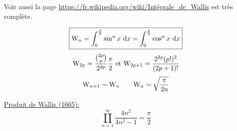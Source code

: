 Voir  aussi la page \url{https://fr.wikipedia.org/wiki/Intégrale_de_Wallis} est très complète. 

$$\boxed{\mathrm{W}_n = \int_{0}^{\frac{\pi}{2}} \sin^n x\ \mathrm{d} x = \int_{0}^{\frac{\pi}{2}} \cos^n x\ \mathrm{d} x}$$
$$\mathrm{W}_{2p} = \frac{\binom{2p}{p}}{2^{2p}}\frac{\pi}{2} \text{ et } \mathrm{W}_{2p+1} = \frac{2^{2p} (p!)^2}{(2p+1)!}$$
$$\mathrm{W}_{n+1} \sim \mathrm{W}_n \qquad \mathrm{W}_n \sim \sqrt{\frac{\pi}{2n}}$$

\underline{Produit de Wallis (1665):}
$$\prod_{n=1}^{\infty} \frac{4n^2}{4n^2-1} = \frac{\pi}{2}$$